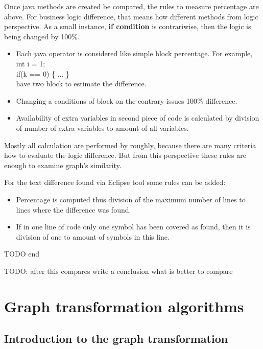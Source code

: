 \documentclass{report}
\begin{document}
Once java methods are created be compared, the rules to measure percentage are above.
For business logic difference, that means how different methods from logic perspective. As a small instance, \textbf{if condition} is contrariwise, then the logic is being changed by 100\%.
\begin{itemize}
	\item Each java operator is considered like simple block percentage. For example, 
	int i = 1; 	\\
	if(k == 0) \{ ... \} \\
	have two block to estimate the difference.
	\item Changing a conditions of block on the contrary issues 100\% difference.
	\item Availability of extra variables in second piece of code is calculated by division of 
	number of extra variables to amount of all variables.
\end{itemize}
Mostly all calculation are performed by roughly, because there are many criteria how to evaluate the logic difference. But from this perspective these rules are enough to examine graph's similarity.

For the text difference found via Eclipse tool some rules can be added:
\begin{itemize}
	\item Percentage is computed thus division of the maximum number of lines to lines where the difference was found.
	\item If in one line of code only one symbol has been covered as found, then it is division of one to amount of symbols in this line. 
\end{itemize}



TODO end

TODO: after this compares write a conclusion what is better to compare


\chapter{Graph transformation algorithms}
\label{cha:Algorithms}

\section{Introduction to the graph transformation}
\end{document}
